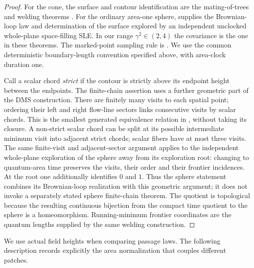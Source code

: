 \documentclass[11pt]{article}
\numberwithin{equation}{section}
\theoremstyle{definition}
\theoremstyle{remark}
\newcommand{\1}{\mathbf 1}
\begin{document}
\begin{proof}
For the cone, the surface and contour identification are the
mating-of-trees and welding theorems
\cite[Theorems~1.9 and~1.11]{DMSMating}. For the ordinary area-one sphere,
\cite[Theorem~1.1]{MillerSheffieldSphere} supplies the Brownian-loop law
and determination of the surface explored by an independent unclocked
whole-plane space-filling SLE. In our range $\gamma^2\in(2,4)$ the
covariance is the one in these theorems. The marked-point sampling rule
is \cite[Proposition~A.13]{DMSMating}. We use the common deterministic
boundary-length convention specified above, with area-clock duration one.

Call a scalar chord \emph{strict} if the contour is strictly above its
endpoint height between the endpoints.  The finite-chain assertion uses
a further geometric part of the DMS
construction. There are finitely many visits to each spatial point;
ordering their left and right flow-line sectors links consecutive visits
by scalar chords. This is the smallest generated equivalence relation in
\cite[Lemmas~8.9, 8.13--8.15 and Theorem~8.18]{DMSMating}, without taking
its closure. A non-strict scalar chord can be split at its possible
intermediate minimum visit into adjacent strict chords; scalar fibers
have at most three visits. The same finite-visit and adjacent-sector
argument applies to the independent whole-plane exploration of the
sphere away from its exploration root: changing to quantum-area time
preserves the visits, their order and their frontier incidences. At the
root one additionally identifies $0$ and $1$. Thus the sphere statement
combines its Brownian-loop realization with this geometric argument;
it does not invoke a separately stated sphere finite-chain theorem.
The quotient is topological because the resulting continuous bijection
from the compact time quotient to the sphere is a homeomorphism.
Running-minimum frontier coordinates are the quantum lengths supplied
by the same welding construction.
\end{proof}

We use actual field heights when comparing passage laws.  The following
description records explicitly the area normalization that couples
different patches.
\end{document}
